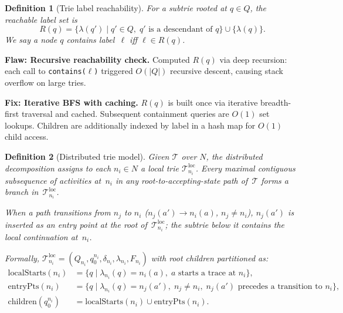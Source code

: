 \documentclass[11pt,a4paper]{article}
\newtheorem{definition}{Definition}
\newcommand{\Nodes}{N}
\newcommand{\T}{\mathcal{T}}
\newcommand{\Tl}{\T^{\mathrm{loc}}}
\newcommand{\na}[2]{#1(#2)}
\newcommand{\ep}{\mathrm{entryPts}}
\newcommand{\ls}{\mathrm{localStarts}}
\begin{document}
\begin{definition}[Trie label reachability]\label{def:reachability}
  For a subtrie rooted at $q \in Q$, the \emph{reachable label set} is
  \[
    R(q) = \{ \lambda(q') \mid q' \in Q,\;
              q' \text{ is a descendant of } q \} \cup \{ \lambda(q) \}.
  \]
  We say a node $q$ \emph{contains} label~$\ell$ iff $\ell \in R(q)$.
\end{definition}

\begin{oldbox}
\textbf{Flaw: Recursive reachability check.}\;
Computed $R(q)$ via deep recursion:
each call to \texttt{contains($\ell$)} triggered $O(|Q|)$ recursive
descent, causing stack overflow on large tries.
\end{oldbox}

\begin{newboxelem}
\textbf{Fix: Iterative BFS with caching.}\;
$R(q)$ is built once via iterative breadth-first traversal and cached.
Subsequent containment queries are $O(1)$ set lookups.
Children are additionally indexed by label in a hash map for $O(1)$
child access.
\end{newboxelem}

\begin{definition}[Distributed trie model]\label{def:dist-trie}
  Given $\T$ over $\Nodes$, the \emph{distributed decomposition} assigns
  to each $n_i \in \Nodes$ a \emph{local trie} $\Tl_{n_i}$.
  Every maximal contiguous subsequence of activities at~$n_i$ in any
  root-to-accepting-state path of~$\T$ forms a branch in~$\Tl_{n_i}$.

  When a path transitions from $n_j$ to $n_i$
  ($\na{n_j}{a'} \to \na{n_i}{a}$, $n_j \neq n_i$),
  $\na{n_j}{a'}$ is inserted as an \emph{entry point} at the root
  of~$\Tl_{n_i}$; the subtrie below it contains the local continuation
  at~$n_i$.

  Formally,
  $\Tl_{n_i} = (Q_{n_i}, q_0^{n_i}, \delta_{n_i}, \lambda_{n_i}, F_{n_i})$
  with root children partitioned as:
  \begin{align*}
    \ls(n_i) &= \{q \mid \lambda_{n_i}(q)=\na{n_i}{a},\;
      \text{$a$ starts a trace at $n_i$}\},\\
    \ep(n_i) &= \{q \mid \lambda_{n_i}(q)=\na{n_j}{a'},\;
      n_j \neq n_i,\;
      \text{$\na{n_j}{a'}$ precedes a transition to $n_i$}\},\\
    \mathrm{children}(q_0^{n_i})
      &= \ls(n_i) \cup \ep(n_i).
  \end{align*}
\end{definition}
\end{document}
